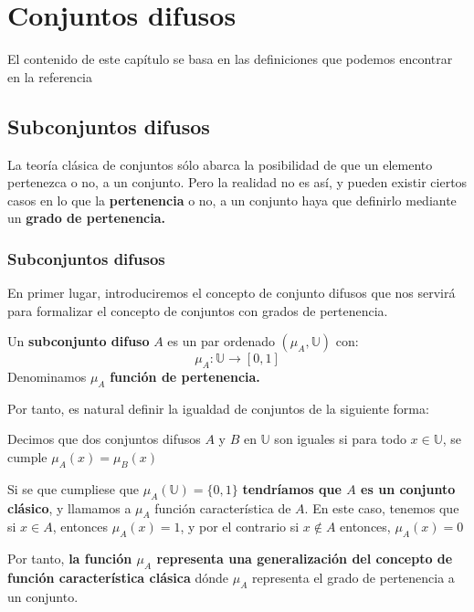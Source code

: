 \chapter{Conjuntos difusos}
El contenido de este capítulo se basa en las definiciones que podemos encontrar en la referencia \cite{fuzzyintro}

\section{Subconjuntos difusos}
La teoría clásica de conjuntos sólo abarca la posibilidad de que un elemento pertenezca o no, a un conjunto. Pero la realidad no es así, y pueden existir ciertos casos en lo que la \textbf{pertenencia} o no, a un conjunto haya que definirlo mediante un \textbf{grado de pertenencia.}

\subsection{Subconjuntos difusos}
En primer lugar, introduciremos el concepto de conjunto difusos que nos servirá para formalizar el concepto de conjuntos con grados de pertenencia.

\begin{definicion}
	Un \textbf{subconjunto difuso} $A$ es un par ordenado $(\mu_A, \mathbb{U})$ con:
	\[
		\mu_A : \mathbb{U} \longrightarrow [0,1]
	\]
	Denominamos $\mu_A$ \textbf{función de pertenencia.}
\end{definicion}

Por tanto, es natural definir la igualdad de conjuntos de la siguiente forma:

\begin{definicion}
	Decimos que dos conjuntos difusos $A$ y $B$ en $\mathbb{U}$ son iguales si para todo $x \in \mathbb{U}$, se cumple $\mu_A(x) = \mu_B(x)$
\end{definicion}

Si se que cumpliese que $\mu_A(\mathbb{U})=\{0, 1\}$ \textbf{tendríamos que $A$ es un conjunto clásico}, y llamamos a $\mu_A$ función característica de $A$. En este caso, tenemos que si $x \in A$, entonces $\mu_A(x)=1$, y por el contrario si $x \notin A$ entonces, $\mu_A(x)=0$

Por tanto, \textbf{la función $\mu_A$ representa una generalización del concepto de función característica clásica} dónde $\mu_A$ representa el grado de pertenencia a un conjunto.

